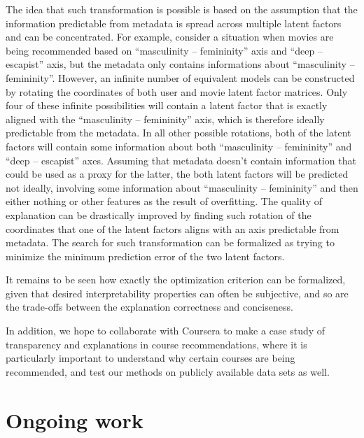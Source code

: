 The idea that such transformation is possible is based on the assumption that
the information predictable from metadata is spread across multiple latent
factors and can be concentrated. For example, consider a situation when movies
are being recommended based on ``masculinity -- femininity'' axis and
``deep -- escapist'' axis, but the metadata only contains informations about
``masculinity -- femininity''. However, an infinite number of equivalent models
can be constructed by rotating the coordinates of both user and movie latent
factor matrices. Only four of these infinite possibilities will contain a latent
factor that is exactly aligned with the ``masculinity -- femininity'' axis,
which is therefore ideally predictable from the metadata. In all other possible
rotations, both of the latent factors will contain some information about both
``masculinity -- femininity'' and ``deep -- escapist'' axes. Assuming that
metadata doesn't contain information that could be used as a proxy for the
latter, the both latent factors will be predicted not ideally, involving some
information about ``masculinity -- femininity'' and then either nothing or
other features as the result of overfitting. The quality of explanation can be
drastically improved by finding such rotation of the coordinates that one of the
latent factors aligns with an axis predictable from metadata. The search for
such transformation can be formalized as trying to minimize the minimum
prediction error of the two latent factors.

It remains to be seen how exactly the optimization criterion can be formalized,
given that desired interpretability properties can often be subjective, and so
are the trade-offs between the explanation correctness and conciseness.

In addition, we hope to collaborate with Coursera to make a case study of
transparency and explanations in course recommendations, where it is
particularly important to understand why certain courses are being recommended,
and test our methods on publicly available data sets as well.

\section{Ongoing work}

